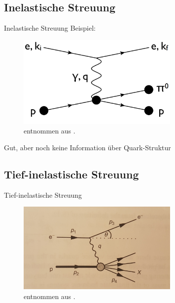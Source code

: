 \documentclass[aspectratio=1610, 9pt]{beamer}
\begin{document}
\subsection{Inelastische Streuung}
\begin{frame}{Inelastische Streuung}
  Beispiel:
  \begin{figure}[H]
  \centering
  \includegraphics[width=0.7\textwidth]{images/inelastic.png}
  \caption{entnommen aus \cite{TP}.}
  \end{figure}
  Gut, aber noch keine Information über Quark-Struktur
\end{frame}

\subsection{Tief-inelastische Streuung}
\begin{frame}{Tief-inelastische Streuung}
\begin{figure}
  \centering
  \includegraphics[width=0.7\textwidth]{images/ep-deep-inelastic-scattering-1.jpg}
  \caption{entnommen aus \cite{Halzen}.}
\end{figure}
\end{frame}
\end{document}
